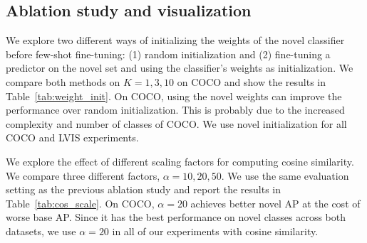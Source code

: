
\subsection{Ablation study and visualization}
\label{sec:vis}

We explore two different ways of initializing the weights of the novel classifier before few-shot fine-tuning: (1) random initialization and (2) fine-tuning a predictor on the novel set and using the classifier's weights as initialization. We compare both methods on $K=1,3,10$ on COCO and show the results in Table~\ref{tab:weight_init}. 
On COCO, using the novel weights can improve the performance over random initialization. This is probably due to the increased complexity and number of classes of COCO. We use novel initialization for all COCO and LVIS experiments.

We explore the effect of different scaling factors for computing cosine similarity. We compare three different factors, $\alpha=10,20,50$. We use the same evaluation setting as the previous ablation study and report the results in Table~\ref{tab:cos_scale}. On COCO, $\alpha=20$ achieves better novel AP at the cost of worse base AP. Since it has the best performance on novel classes across both datasets, we use $\alpha=20$ in all of our experiments with cosine similarity.


\begin{table}[!h]
	\centering
	\footnotesize
	\setlength{\tabcolsep}{0.4em}
	\caption{Ablation of weight initialization of the novel classifier. \vspace{2mm}}
	\label{tab:weight_init} 
\end{table}

